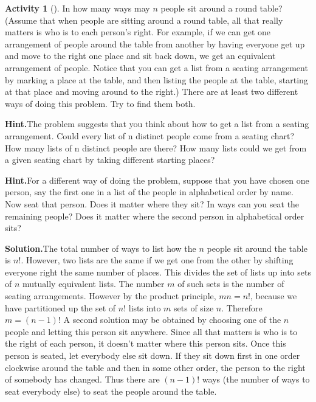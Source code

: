 \documentclass[10pt,]{book}
\theoremstyle{plain}
\theoremstyle{definition}
\newtheorem{activity}[project]{Activity}
\numberwithin{equation}{chapter}
\begin{document}
\begin{activity}[]\label{roundtable}
In how many ways may \(n\) people sit around a round table? (Assume that when people are sitting around a round table, all that really matters is who is to each person's right. For example, if we can get one arrangement of people around the table from another by having everyone get up and move to the right one place and sit back down, we get an equivalent arrangement of people. Notice that you can get a list from a seating arrangement by marking a place at the table, and then listing the people at the table, starting at that place and moving around to the right.) There are at least two different ways of doing this problem. Try to find them both.%
\par\medskip\noindent%
\textbf{Hint.}\quad The problem suggests that you think about how to get a list from a seating arrangement. Could every list of n distinct people come from a seating chart? How many lists of n distinct people are there? How many lists could we get from a given seating chart by taking different starting places?%
\par\medskip\noindent%
\textbf{Hint.}\quad For a different way of doing the problem, suppose that you have chosen one person, say the first one in a list of the people in alphabetical order by name. Now seat that person. Does it matter where they sit? In ways can you seat the remaining people? Does it matter where the second person in alphabetical order sits?%
\par\medskip\noindent%
\textbf{Solution.}\quad The total number of ways to list how the \(n\) people sit around the table is \(n!\). However, two lists are the same if we get one from the other by shifting everyone right the same number of places. This divides the set of lists up into sets of \(n\) mutually equivalent lists. The number \(m\) of such sets is the number of seating arrangements. However by the product principle, \(mn=n!\), because we have partitioned up the set of \(n!\) lists into \(m\) sets of size \(n\). Therefore \(m=(n-1)!\) A second solution may be obtained by choosing one of the \(n\) people and letting this person sit anywhere. Since all that matters is who is to the right of each person, it doesn't matter where this person sits. Once this person is seated, let everybody else sit down. If they sit down first in one order clockwise around the table and then in some other order, the person to the right of somebody has changed. Thus there are \((n-1)!\) ways (the number of ways to seat everybody else) to seat the people around the table.%
\end{activity}
\end{document}
